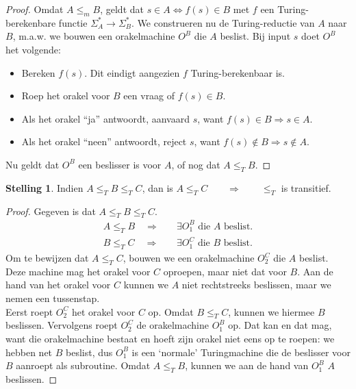\documentclass[kulak]{kulakarticle}
\theoremstyle{definition}
\newtheorem*{stelling}{Stelling}
\begin{document}
	\begin{proof}
		Omdat \(A \leq_m B\), geldt dat \(s\in A \Leftrightarrow f(s)\in B\) met \( f \) een Turing-berekenbare functie \(\Sigma_A^*\to\Sigma_B^*\). We construeren nu de Turing-reductie van \(A\) naar \(B\), m.a.w. we bouwen een orakelmachine \(O^B\) die \(A\) beslist. Bij input \(s\) doet \(O^B\) het volgende:
		\begin{itemize}
			\item Bereken \(f(s)\). Dit eindigt aangezien \(f\) Turing-berekenbaar is.
			\item Roep het orakel voor \(B\) een vraag of \(f(s)\in B\).
			\item Als het orakel ``ja'' antwoordt, aanvaard \(s\), want \(f(s)\in B \Rightarrow s\in A\).
			\item Als het orakel ``neen'' antwoordt, reject \(s\), want \(f(s)\notin B \Rightarrow s\notin A\).
		\end{itemize}
		Nu geldt dat \(O^B\) een beslisser is voor \(A\), of nog dat \(A \leq_T B\).
	\end{proof}

	\begin{stelling}
		Indien \(A \leq_T B \leq_T C\), dan is \(A \leq_T C \qquad \Longrightarrow \qquad \leq_T\) is transitief.
	\end{stelling}

	\begin{proof} Gegeven is dat \(A \leq_T B \leq_T C\).
		\begin{align*}
			A \leq_T B \quad \Longrightarrow \quad &\exists O_1^B \text{ die $A$ beslist}.\\
			B \leq_T C \quad \Longrightarrow \quad &\exists O_1^C \text{ die $B$ beslist}.
		\end{align*}
		Om te bewijzen dat \(A \leq_T C\), bouwen we een orakelmachine \(O_2^C\) die \(A\) beslist. Deze machine mag het orakel voor \(C\) oproepen, maar niet dat voor \(B\). Aan de hand van het orakel voor \(C\) kunnen we \(A\) niet rechtstreeks beslissen, maar we nemen een tussenstap. \hfill \\

		Eerst roept \(O_2^C\) het orakel voor \(C\) op. Omdat \(B \leq_T C\), kunnen we hiermee \(B\) beslissen. Vervolgens roept \(O_2^C\) de orakelmachine \(O_1^B\) op. Dat kan en dat mag, want die orakelmachine bestaat en hoeft zijn orakel niet eens op te roepen: we hebben net \(B\) beslist, dus \(O_1^B\) is een `normale' Turingmachine die de beslisser voor \(B\) aanroept als subroutine. Omdat \(A \leq_T B\), kunnen we aan de hand van \(O_1^B\) \(A\) beslissen.
	\end{proof}
\end{document}
